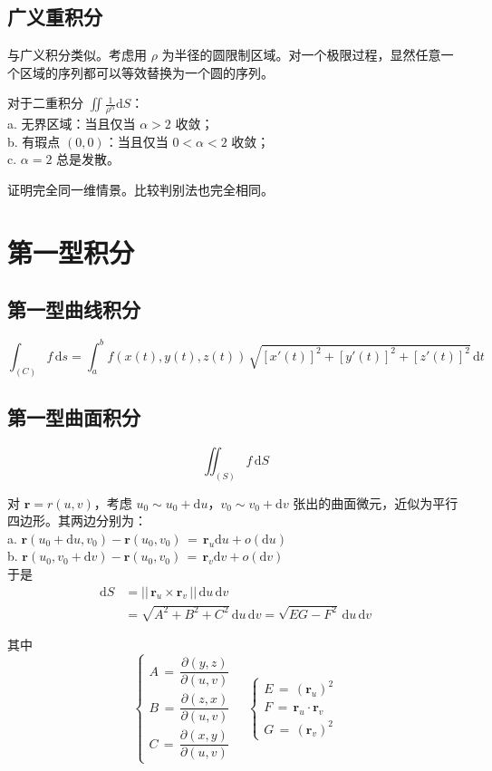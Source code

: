 \documentclass[12pt, a4paper, UTF8, openany]{ctexbook}
\newcommand{\dif}{\mathrm{d}}
\newcommand{\sdif}{\,\dif}
\newcommand{\mat}[1]{\mathbf{#1}}
\newcommand{\len}[1]{||\, #1 \,||}%
\begin{document}
        \subsection{广义重积分}
        与广义积分类似。考虑用 $\rho$ 为半径的圆限制区域。对一个极限过程，显然任意一个区域的序列都可以等效替换为一个圆的序列。

        对于二重积分 $\iint \frac{1}{\rho^\alpha} \dif S$：\\
        a. 无界区域：当且仅当 $\alpha > 2$ 收敛；\\
        b. 有瑕点 $(0, 0)$：当且仅当 $0 < \alpha < 2$ 收敛；\\
        c. $\alpha = 2$ 总是发散。

        证明完全同一维情景。比较判别法也完全相同。

    \section{第一型积分}
        \subsection{第一型曲线积分}
        $$\int_{(C)} f \sdif s = \int_{a}^{b} f(x(t), y(t), z(t)) \, \sqrt{[x'(t)]^2 + [y'(t)]^2 + [z'(t)]^2} \sdif t$$

        \subsection{第一型曲面积分}
        $$\iint_{(S)} f \sdif S$$

        对 $\mat{r} = r(u, v)$，考虑 $u_0 \sim u_0 + \dif u$，$v_0 \sim v_0 +\dif v$ 张出的曲面微元，近似为平行四边形。其两边分别为：\\
        a. $\mat{r}(u_0 + \dif u, v_0) - \mat{r}(u_0, v_0) \,=\, \mat{r}_u \dif u + o(\dif u)$ \\
        b. $\mat{r}(u_0, v_0 + \dif v) - \mat{r}(u_0, v_0) \,=\, \mat{r}_v \dif v + o(\dif v)$ \\
        于是 $$\begin{aligned}
            \dif S &= \len{\mat{r}_u \times \mat{r}_v} \sdif u \sdif v \\
            &= \sqrt{A^2 + B^2 + C^2} \sdif u \sdif v = \sqrt{EG - F^2} \sdif u \sdif v
        \end{aligned}$$

        其中
        $$\begin{cases}
            A \,=\, \dfrac{\partial(y, z)}{\partial(u, v)} \\
            B \,=\, \dfrac{\partial(z, x)}{\partial(u, v)} \\
            C \,=\, \dfrac{\partial(x, y)}{\partial(u, v)}
        \end{cases}
        \quad
        \begin{cases}
            E \,=\, (\mat{r}_u)^2 \\
            F \,=\, \mat{r}_u \cdot \mat{r}_v \\
            G \,=\, (\mat{r}_v)^2
        \end{cases}$$
\end{document}
